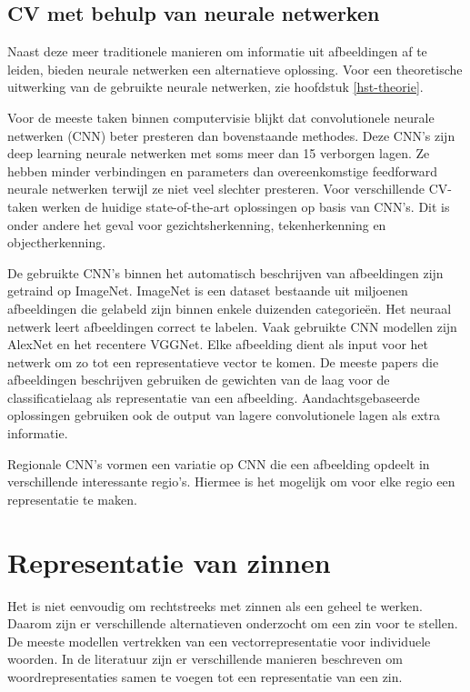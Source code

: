 
\subsection{CV met behulp van neurale netwerken}
Naast deze meer traditionele manieren om informatie uit afbeeldingen af te leiden, bieden neurale netwerken een alternatieve oplossing. Voor een theoretische uitwerking van de gebruikte neurale netwerken, zie hoofdstuk \ref{hst-theorie}.

Voor de meeste taken binnen computervisie blijkt dat convolutionele neurale netwerken (CNN) beter presteren dan bovenstaande methodes. Deze CNN's zijn deep learning neurale netwerken met soms meer dan 15 verborgen lagen. Ze hebben minder verbindingen en parameters dan overeenkomstige feedforward neurale netwerken terwijl ze niet veel slechter presteren\cite{Krizhevsky2012a}. 
Voor verschillende CV-taken werken de huidige state-of-the-art oplossingen op basis van CNN's. Dit is onder andere het geval voor gezichtsherkenning\cite{Zhou2015}, tekenherkenning\cite{Ciresan2012} en objectherkenning\cite{Szegedy2014}.

De gebruikte CNN's binnen het automatisch beschrijven van afbeeldingen zijn getraind op ImageNet\cite{Russakovsky2014}. ImageNet is een dataset bestaande uit miljoenen afbeeldingen die gelabeld zijn binnen enkele duizenden categorie\"en. Het neuraal netwerk leert afbeeldingen correct te labelen. Vaak gebruikte CNN modellen zijn AlexNet\cite{Krizhevsky2012a} en het recentere VGGNet\cite{Arge2015}. Elke afbeelding dient als input voor het netwerk om zo tot een representatieve vector te komen. De meeste papers die afbeeldingen beschrijven gebruiken de gewichten van de laag voor de classificatielaag als representatie van een afbeelding\cite{Chen2014,Karpathy2015,Mao2014a,Google}. Aandachtsgebaseerde oplossingen\cite{Jin2015,Xu2015} gebruiken ook de output van lagere convolutionele lagen als extra informatie.

Regionale CNN's vormen een variatie op CNN die een afbeelding opdeelt in verschillende interessante regio's. Hiermee is het mogelijk om voor elke regio een representatie te maken\cite{Karpathy2015,Mitchell2015}. 

\section{Representatie van zinnen}
Het is niet eenvoudig om rechtstreeks met zinnen als een geheel te werken. Daarom zijn er verschillende alternatieven onderzocht om een zin voor te stellen.
De meeste modellen vertrekken van een vectorrepresentatie voor individuele woorden. In de literatuur zijn er verschillende manieren beschreven om woordrepresentaties samen te voegen tot een representatie van een zin.

